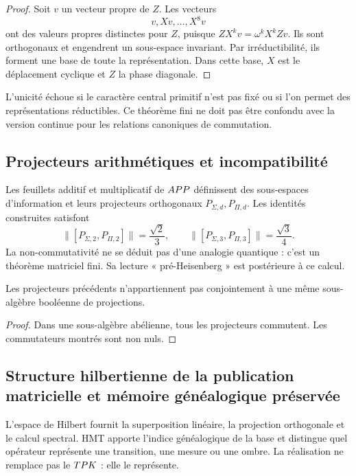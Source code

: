 \begin{proof}
Soit \(v\) un vecteur propre de \(Z\). Les vecteurs
\[
  v,Xv,\ldots,X^8v
\]
ont des valeurs propres distinctes pour \(Z\), puisque
\(ZX^kv=\omega^kX^kZv\). Ils sont orthogonaux et engendrent un sous-espace
invariant. Par irréductibilité, ils forment une base de toute la représentation.
Dans cette base, \(X\) est le déplacement cyclique et \(Z\) la phase diagonale.
\end{proof}

\begin{controlbox}
L’unicité échoue si le caractère central primitif n’est pas fixé ou si l’on
permet des représentations réductibles. Ce théorème fini ne doit pas être confondu
avec la version continue pour les relations canoniques de commutation.
\end{controlbox}

\subsection{Projecteurs arithmétiques et incompatibilité}

Les feuillets additif et multiplicatif de \(APP\) définissent des sous-espaces
d’information et leurs projecteurs orthogonaux
\(P_{\Sigma,d},P_{\Pi,d}\). Les identités construites satisfont
\[
 \|[P_{\Sigma,2},P_{\Pi,2}]\|
 =\frac{\sqrt2}{3},
 \qquad
 \|[P_{\Sigma,3},P_{\Pi,3}]\|
 =\frac{\sqrt3}{4}.
\]
La non-commutativité ne se déduit pas d’une analogie quantique : c’est un théorème
matriciel fini. Sa lecture « pré-Heisenberg » est postérieure à ce calcul.

\begin{proposition}
Les projecteurs précédents n’appartiennent pas conjointement à une même
sous-algèbre booléenne de projections.
\end{proposition}

\begin{proof}
Dans une sous-algèbre abélienne, tous les projecteurs commutent. Les commutateurs
montrés sont non nuls.
\end{proof}

\subsection{Structure hilbertienne de la publication matricielle et mémoire généalogique préservée}

L’espace de Hilbert fournit la superposition linéaire, la projection orthogonale
et le calcul spectral. HMT apporte l’indice généalogique de la base et distingue
quel opérateur représente une transition, une mesure ou une ombre. La
réalisation ne remplace pas le \(TPK\) : elle le représente.

